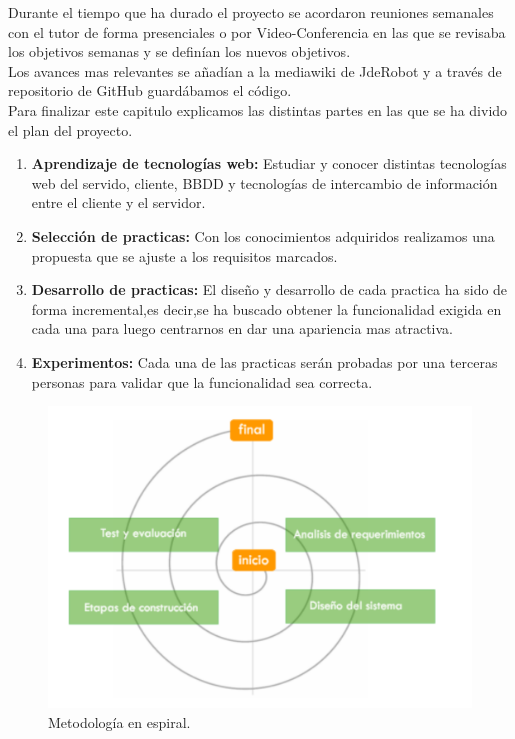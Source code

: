 Durante el tiempo que ha durado el proyecto se acordaron reuniones semanales con el tutor de forma presenciales o por Video-Conferencia en las que se revisaba los objetivos semanas y se definían los nuevos objetivos.
\\Los avances mas relevantes se añadían a la mediawiki \cite{Mediawiki} de JdeRobot y a través de repositorio de GitHub \cite{Repositorio} guardábamos el código.
\\Para finalizar este capitulo explicamos las distintas partes en las que se ha divido el plan del proyecto.
\begin{enumerate}
\item \textbf{Aprendizaje de tecnologías web:} Estudiar y conocer distintas tecnologías web del servido, cliente, BBDD y tecnologías de intercambio de información entre el cliente y el servidor.
\item \textbf{Selección de practicas:} Con los conocimientos adquiridos realizamos una propuesta que se ajuste a los requisitos marcados.
\item \textbf{Desarrollo de practicas:} El diseño y desarrollo de cada practica ha sido de forma incremental,es decir,se ha buscado obtener la funcionalidad exigida en cada una para luego centrarnos en dar una apariencia mas atractiva.
\item \textbf{Experimentos:} Cada una de las practicas serán probadas por una terceras personas para validar que la funcionalidad sea correcta.
\end{enumerate}
\begin{figure}[!h]
\centering
\includegraphics[width=0.8\linewidth]{Figures/espiral}
\decoRule
\caption[Metodología en espiral]{Metodología en espiral.}
\label{fig:espiral}
\end{figure}
